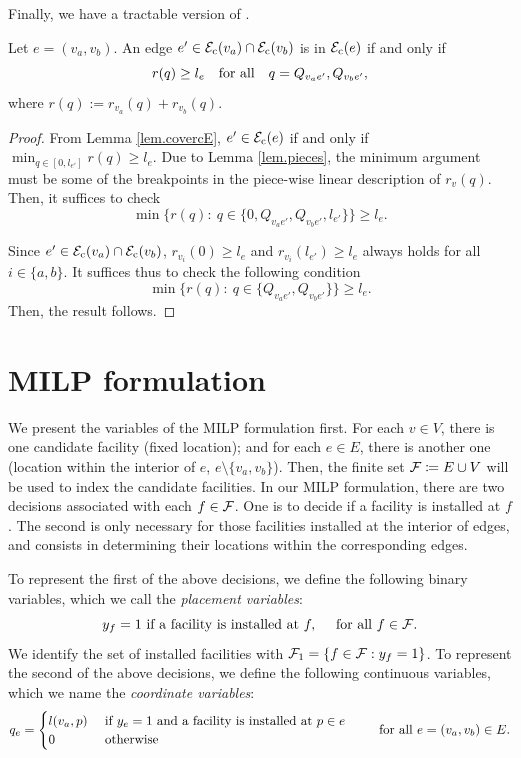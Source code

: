 Finally, we have a tractable version of .

\begin{proposition}\label{prop.chara.cEe}
Let $e=(v_a,v_b)$. An edge $e'\in {\mathcal E}_{\mathrm{c}}(v_a)\cap {\mathcal E}_{\mathrm{c}}(v_b)$ is in ${\mathcal E}_{\mathrm{c}}(e)$ if and only if
$$r(q)\geq l_e\quad \textup{for all}\quad q=Q_{v_ae'}, Q_{v_be'},$$
where $r(q):=r_{v_a}(q)+r_{v_b}(q)$.
\end{proposition}
\begin{proof}
From Lemma \ref{lem.covercE}, $e' \in {\mathcal E}_{\mathrm{c}}(e)$ if and only if $\min_{q \in [0, l_{e'}]} r(q) \ge l_e$. Due to Lemma \ref{lem.pieces}, the minimum argument must be some of the breakpoints in the piece-wise linear description of $r_v(q)$. Then, it suffices to check
\begin{equation*}
	\min \{r(q):\: q \in \{0, Q_{v_ae'}, Q_{v_be'}, l_{e'}\}\} \ge l_e.
\end{equation*}

Since $e'\in {\mathcal E}_{\mathrm{c}}(v_a)\cap {\mathcal E}_{\mathrm{c}}(v_b)$, $r_{v_i}(0)\geq l_e$ and  $r_{v_i}(l_{e'})\geq l_e$  always holds for all $i\in\{a,b\}$.
 It suffices thus to check  the following condition
\begin{equation*}
	\min \{r(q):\: q \in \{ Q_{v_ae'}, Q_{v_be'} \}\}  \ge l_e.
\end{equation*}
Then, the result follows.
\end{proof}



\section{MILP formulation}\label{sec:milp}


We present the variables of the MILP formulation first. For each $v \in V$, there is one candidate facility (fixed location); and for each $e \in E$, there is another one (location within the interior of $e$, $e\setminus\{v_a,v_b\}$). Then, the finite set $\mathcal F \coloneqq E \cup V$ will be used to index the candidate facilities.
In our MILP formulation, there are two decisions associated with each  $f\in \mathcal F$. One is to decide if a facility is installed at $f$. The second is only necessary for those facilities installed at the interior of edges, and consists in determining their locations within the corresponding edges.

To represent the first of the above decisions, we define the following binary variables, which we call the \emph{placement variables}:
$$y_f=1 \textup{ if a facility  is installed at } f,\quad  \textup{ for all }f \in \mathcal F.$$
We identify the set of installed facilities with $\mathcal F_1 = \{f \in \mathcal F: y_f = 1\}$. To represent the second of the above decisions, we define the following continuous variables, which we name the \emph{coordinate variables}:
$$q_e=
\begin{cases}
l(v_a,p) &\textup{ if } y_e=1 \textup{ and a facility is installed at } p\in e\\
0 &\textup{ otherwise}
\end{cases}
\qquad \textup{ for all }e=(v_a,v_b)\in E.$$



